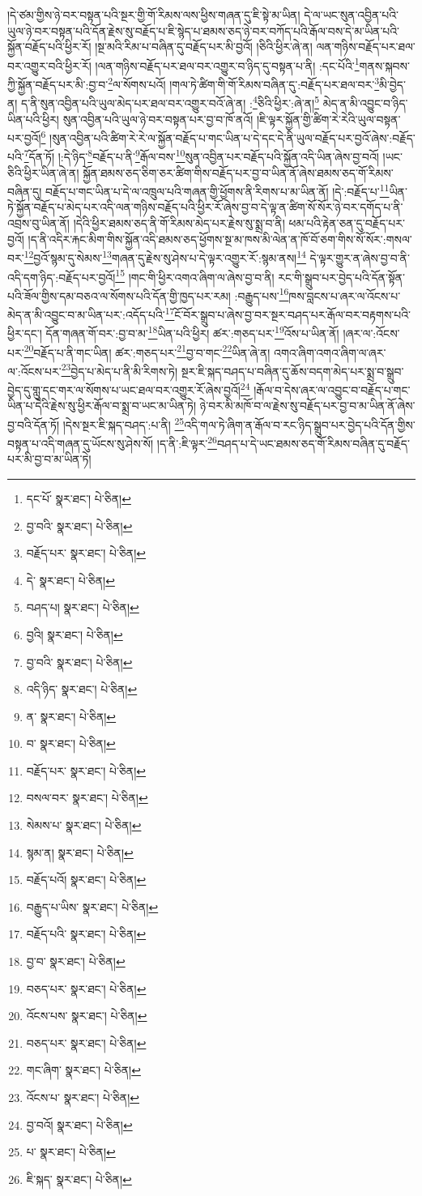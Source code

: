 །དེ་ཙམ་གྱིས་ཉེ་བར་བསྟན་པའི་སྔར་གྱི་གོ་རིམས་ལས་ཕྱིས་གཞན་དུ་ཇི་སྟེ་མ་ཡིན། དེ་ལ་ཡང་སུན་འབྱིན་པའི་ཡུལ་ཉེ་བར་བསྟན་པའི་དོན་རྗེས་སུ་བརྗོད་པ་ཇི་སྙེད་པ་ཐམས་ཅད་ཉེ་བར་བཀོད་པའི་རྒོལ་བས་དེ་མ་ཡིན་པའི་སྐྱོན་བརྗོད་པའི་ཕྱིར་རོ། །སྔ་མའི་རིམ་པ་བཞིན་དུ་བརྗོད་པར་མི་བྱའོ། །ཅིའི་ཕྱིར་ཞེ་ན། ལན་གཉིས་བརྗོད་པར་ཐལ་བར་འགྱུར་བའི་ཕྱིར་རོ། །ལན་གཉིས་བརྗོད་པར་ཐལ་བར་འགྱུར་བ་ཉིད་དུ་བསྟན་པ་ནི། :དང་པོའི་\footnote{དང་པོ་  སྣར་ཐང་།  པེ་ཅིན། }གནས་སྐབས་ཀྱི་སྐྱོན་བརྗོད་པར་མི་:བྱ་བ་\footnote{བྱ་བའི་  སྣར་ཐང་།  པེ་ཅིན། }ལ་སོགས་པའོ། །གལ་ཏེ་ཚིག་གི་གོ་རིམས་བཞིན་དུ་:བརྗོད་པར་ཐལ་བར་\footnote{བརྗོད་པར་  སྣར་ཐང་།  པེ་ཅིན། }མི་བྱེད་ན། ད་ནི་སུན་འབྱིན་པའི་ཡུལ་མེད་པར་ཐལ་བར་འགྱུར་བའོ་ཞེ་ན། :\footnote{དེ་  སྣར་ཐང་།  པེ་ཅིན། }ཅིའི་ཕྱིར་:ཞེ་ན།\footnote{བཤད་པ།  སྣར་ཐང་།  པེ་ཅིན། } མེད་ན་མི་འབྱུང་བ་ཉིད་ཡིན་པའི་ཕྱིར། སུན་འབྱིན་པའི་ཡུལ་ཉེ་བར་བསྟན་པར་བྱ་བ་ཁོ་ནའོ། །ཇི་ལྟར་སྐྱོན་གྱི་ཚིག་རེ་རེའི་ཡུལ་བསྟན་པར་བྱའོ།\footnote{བྱའི།  སྣར་ཐང་།  པེ་ཅིན། } །སུན་འབྱིན་པའི་ཚིག་རེ་རེ་ལ་སྐྱོན་བརྗོད་པ་གང་ཡིན་པ་དེ་དང་དེ་ནི་ཡུལ་བརྗོད་པར་བྱའོ་ཞེས་:བརྗོད་པའི་\footnote{བྱ་བའི་  སྣར་ཐང་།  པེ་ཅིན། }དོན་ཏོ། །:དེ་ཉིད་\footnote{འདི་ཉིད་  སྣར་ཐང་།  པེ་ཅིན། }བརྗོད་པ་ནི་\footnote{ན་  སྣར་ཐང་།  པེ་ཅིན། }རྒོལ་བས་\footnote{བ་  སྣར་ཐང་།  པེ་ཅིན། }སུན་འབྱིན་པར་བརྗོད་པའི་སྐྱོན་འདི་ཡིན་ཞེས་བྱ་བའོ། །ཡང་ཅིའི་ཕྱིར་ཡིན་ཞེ་ན། སྐྱོན་ཐམས་ཅད་ཅིག་ཅར་ཚིག་གིས་བརྗོད་པར་བྱ་བ་ཡིན་ནོ་ཞེས་ཐམས་ཅད་གོ་རིམས་བཞིན་དུ། བརྗོད་པ་གང་ཡིན་པ་དེ་ལ་འཁྲུལ་པའི་གཞན་གྱི་ཕྱོགས་ནི་རིགས་པ་མ་ཡིན་ནོ། །དེ་:བརྗོད་པ་\footnote{བརྗོད་པར་  སྣར་ཐང་།  པེ་ཅིན། }ཡིན་ཏེ་སྐྱོན་བརྗོད་པ་མེད་པར་འདི་ལན་གཉིས་བརྗོད་པའི་ཕྱིར་རོ་ཞེས་བྱ་བ་དེ་ལྟ་ན་ཚིག་སོ་སོར་ཉེ་བར་དགོད་པ་ནི་འབྲས་བུ་ཡིན་ནོ། །དེའི་ཕྱིར་ཐམས་ཅད་ནི་གོ་རིམས་མེད་པར་རྗེས་སུ་སྨྲ་བ་ནི། ཕམ་པའི་རྟེན་ཅན་དུ་བརྗོད་པར་བྱའོ། །ད་ནི་འདིར་རྐང་མིག་གིས་སྐྱོན་འདི་ཐམས་ཅད་ཕྱོགས་སྔ་མ་ཁས་མི་ལེན་ན་ཁོ་བོ་ཅག་གིས་སོ་སོར་:གསལ་བར་\footnote{བསལ་བར་  སྣར་ཐང་།  པེ་ཅིན། }བྱའོ་སྙམ་དུ་སེམས་\footnote{སེམས་པ་  སྣར་ཐང་།  པེ་ཅིན། }གཞན་དུ་རྗེས་སུ་ཤེས་པ་དེ་ལྟར་འགྱུར་རོ་:སྙམ་ནས།\footnote{སྙམ་ན།  སྣར་ཐང་།  པེ་ཅིན། } དེ་ལྟར་གྱུར་ན་ཞེས་བྱ་བ་ནི་འདི་དག་ཉིད་:བརྗོད་པར་བྱའོ།\footnote{བརྗོད་པའོ།  སྣར་ཐང་།  པེ་ཅིན། } །གང་གི་ཕྱིར་འགའ་ཞིག་ལ་ཞེས་བྱ་བ་ནི། རང་གི་སྒྲུབ་པར་བྱེད་པའི་དོན་སྟོན་པའི་ཟོལ་གྱིས་དམ་བཅའ་ལ་སོགས་པའི་དོན་གྱི་ཁྱད་པར་རམ། :བརྒྱུད་པས་\footnote{བརྒྱུད་པ་ཡིས་  སྣར་ཐང་།  པེ་ཅིན། }ཁས་བླངས་པ་ཞར་ལ་འོངས་པ་མེད་ན་མི་འབྱུང་བ་མ་ཡིན་པར་:འདོད་པའི་\footnote{བརྗོད་པའི་  སྣར་ཐང་།  པེ་ཅིན། }ངོ་བོར་སྒྲུབ་པ་ཞེས་བྱ་བར་སྔར་བཤད་པར་རྒོལ་བར་བརྟགས་པའི་ཕྱིར་དང་། དོན་གཞན་གོ་བར་:བྱ་བ་མ་\footnote{བྱ་བ་  སྣར་ཐང་།  པེ་ཅིན། }ཡིན་པའི་ཕྱིར། ཚར་:གཅད་པར་\footnote{བཅད་པར་  སྣར་ཐང་།  པེ་ཅིན། }འོས་པ་ཡིན་ནོ། །ཞར་ལ་:འོངས་པར་\footnote{འོངས་པས་  སྣར་ཐང་།  པེ་ཅིན། }བརྗོད་པ་ནི་གང་ཡིན། ཚར་:གཅད་པར་\footnote{བཅད་པར་  སྣར་ཐང་།  པེ་ཅིན། }བྱ་བ་གང་\footnote{གང་ཞིག་  སྣར་ཐང་།  པེ་ཅིན། }ཡིན་ཞེ་ན། འགའ་ཞིག་འགའ་ཞིག་ལ་ཞར་ལ་:འོངས་པར་\footnote{འོངས་པ་  སྣར་ཐང་།  པེ་ཅིན། }བྱེད་པ་མེད་པ་ནི་མི་རིགས་ཏེ། སྔར་ཇི་སྐད་བཤད་པ་བཞིན་དུ་ཆོས་བདག་མེད་པར་སྨྲ་བ་སྒྲུབ་བྱེད་དུ་གླུ་དང་གར་ལ་སོགས་པ་ཡང་ཐལ་བར་འགྱུར་རོ་ཞེས་བྱའོ།\footnote{བྱ་བའོ།  སྣར་ཐང་།  པེ་ཅིན། } །རྒོལ་བ་དེས་ཞར་ལ་འབྱུང་བ་བརྗོད་པ་གང་ཡིན་པ་དེའི་རྗེས་སུ་ཕྱིར་རྒོལ་བ་སྨྲ་བ་ཡང་མ་ཡིན་ཏེ། ཉེ་བར་མི་མཁོ་བ་ལ་རྗེས་སུ་བརྗོད་པར་བྱ་བ་མ་ཡིན་ནོ་ཞེས་བྱ་བའི་དོན་ཏོ། །དེས་སྔར་ཇི་སྐད་བཤད་:པ་ནི། \footnote{པ་  སྣར་ཐང་།  པེ་ཅིན། }འདི་གལ་ཏེ་ཞིག་ན་རྒོལ་བ་རང་ཉིད་སྒྲུབ་པར་བྱེད་པའི་དོན་གྱིས་བསྟན་པ་འདི་གཞན་དུ་ཡོངས་སུ་ཤེས་སོ། །ད་ནི་:ཇི་ལྟར་\footnote{ཇི་སྐད་  སྣར་ཐང་།  པེ་ཅིན། }བཤད་པ་དེ་ཡང་ཐམས་ཅད་གོ་རིམས་བཞིན་དུ་བརྗོད་པར་མི་བྱ་བ་མ་ཡིན་ཏེ། 